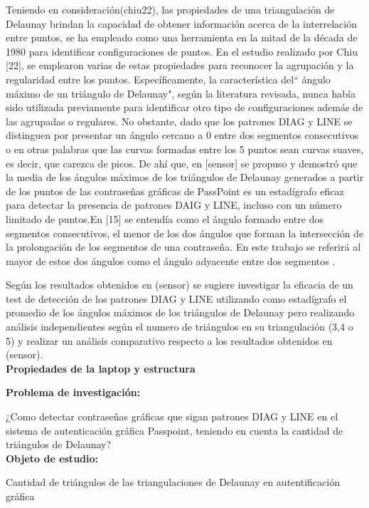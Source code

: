 \documentclass[12pt]{report}
\begin{document}
	Teniendo en consideración(chiu22), las propiedades de una triangulación de Delaunay brindan la capacidad de obtener información acerca de la interrelación entre puntos, se ha empleado como una herramienta en la mitad de la década de 1980 para identificar configuraciones de puntos. En el estudio realizado por Chiu [22], se emplearon varias de estas propiedades para reconocer la agrupación y la regularidad entre los puntos. Específicamente, la característica del`` ángulo máximo de un triángulo de Delaunay", según la literatura revisada, nunca había sido utilizada previamente para identificar otro tipo de configuraciones además de las agrupadas o regulares. No obstante, dado que los patrones DIAG y LINE se distinguen por presentar un ángulo cercano a 0{\degree } entre dos segmentos consecutivos o en otras palabras que las curvas formadas entre los 5 puntos sean curvas suaves, es decir, que carezca de picos.  De ahí que, en [sensor] se propuso y demostró que la media de los ángulos máximos de los triángulos de Delaunay generados a partir de los puntos de las contraseñas gráficas de PassPoint es un estadígrafo eficaz para detectar la presencia de patrones DAIG y LINE, incluso con un número limitado de puntos.En [15] se entendía como el ángulo formado entre dos segmentos consecutivos, el menor de los dos ángulos que forman la intersección de la prolongación de los segmentos de una contraseña. En este trabajo se referirá al mayor de estos dos ángulos como el ángulo adyacente entre dos segmentos .


	
	Según los resultados obtenidos en (sensor) se sugiere investigar la eficacia de un test de detección de los patrones DIAG y LINE  utilizando como estadígrafo el promedio de los ángulos máximos de los triángulos de Delaunay pero realizando análisis independientes según el numero de triángulos en su triangulación (3,4 o 5) y realizar un análisis comparativo respecto a los resultados obtenidos en (sensor).\\
	\textbf{Propiedades de la laptop y estructura}
	
	\large{\textbf{Problema de investigación:}}
	
	\normalsize{¿Como  detectar contraseñas gráficas que sigan patrones DIAG y LINE  en el sistema de autenticación gráfica Passpoint, teniendo en cuenta la cantidad de triángulos de Delaunay?}\\
	
	\large{\textbf{Objeto de estudio:}}
	
	\normalsize{Cantidad de triángulos de las  triangulaciones de Delaunay  en autentificación gráfica}\\
	
\end{document}

